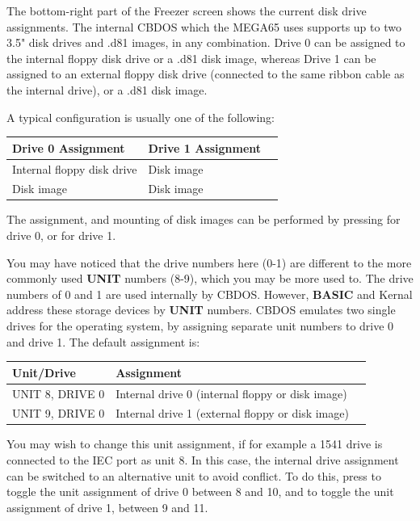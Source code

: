 The bottom-right part of the Freezer screen shows the current disk drive assignments.
The internal CBDOS which the MEGA65 uses supports up to two
3.5" disk drives and .d81 images, in any combination.
Drive 0 can be assigned to the internal floppy disk drive or a .d81 disk image,
whereas Drive 1 can be assigned to an external floppy disk drive (connected to the
same ribbon cable as the internal drive), or a .d81 disk image.

A typical configuration is usually one of the following:
\begin{center}
\begin{tabular}{|l|l|l|}
\hline
{\bf Drive 0 Assignment} & {\bf Drive 1 Assignment} \\
\hline
Internal floppy disk drive &  Disk image \\
Disk image                 &  Disk image \\
\hline
\end{tabular}
\end{center}

The assignment, and mounting of disk images can be performed by pressing
 for drive 0, or  for drive 1.

You may have noticed that the drive numbers here (0-1) are different to the more commonly used {\bf UNIT}
numbers (8-9), which you may be more used to. The drive numbers of 0 and 1 are used internally by CBDOS.
However, {\bf BASIC} and Kernal address these storage devices by {\bf UNIT} numbers. CBDOS emulates two single drives for
the operating system, by assigning separate unit numbers to drive 0 and drive 1.
The default assignment is:

\begin{center}
\begin{tabular}{|l|l|l|}
\hline
{\bf Unit/Drive} & {\bf Assignment} \\
\hline
UNIT 8, DRIVE 0  & Internal drive 0 (internal floppy or disk image) \\
UNIT 9, DRIVE 0 & Internal drive 1 (external floppy or disk image) \\
\hline
\end{tabular}
\end{center}


You may wish to change this unit assignment, if for example
a 1541 drive is connected to the IEC port as unit 8.
In this case, the internal drive assignment can be switched to an alternative unit
to avoid conflict. To do this, press  to toggle the unit assignment of drive 0
between 8 and 10, and  to toggle the unit assignment of drive 1, between 9 and 11.

